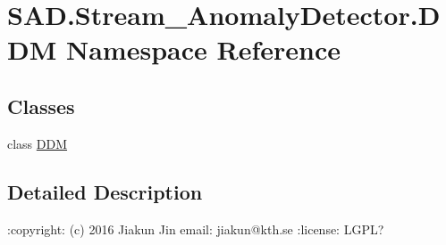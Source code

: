\hypertarget{namespaceSAD_1_1Stream__AnomalyDetector_1_1DDM}{}\section{S\+A\+D.\+Stream\+\_\+\+Anomaly\+Detector.\+D\+DM Namespace Reference}
\label{namespaceSAD_1_1Stream__AnomalyDetector_1_1DDM}
\subsection*{Classes}
\begin{DoxyCompactItemize}
\item 
class \hyperlink{classSAD_1_1Stream__AnomalyDetector_1_1DDM_1_1DDM}{D\+DM}
\end{DoxyCompactItemize}


\subsection{Detailed Description}
\begin{DoxyVerb}:copyright: (c) 2016 Jiakun Jin
email: jiakun@kth.se
:license: LGPL?
\end{DoxyVerb}
 